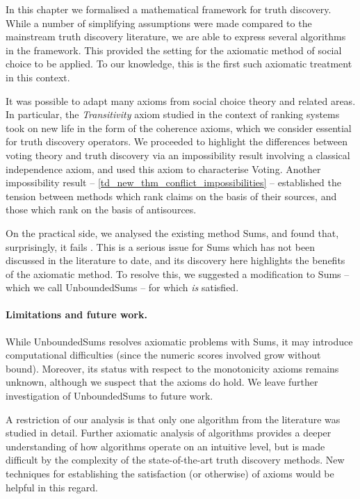 In this chapter we formalised a mathematical framework for truth discovery.
While a number of simplifying assumptions were made compared to the mainstream
truth discovery literature, we are able to express several algorithms in the
framework. This provided the setting for the axiomatic method of social choice
to be applied. To our knowledge, this is the first such axiomatic treatment in
this context.

It was possible to adapt many axioms from social choice theory and related
areas. In particular, the \emph{Transitivity} axiom studied in the context of
ranking systems~\cite{tennenholtz2004,altman2008} took on new life in the form
of the coherence axioms, which we consider essential for truth discovery
operators. We proceeded to highlight the differences between voting theory and
truth discovery via an impossibility result involving a classical independence
axiom, and used this axiom to characterise Voting. Another impossibility result
-- \cref{td_new_thm_conflict_impossibilities} -- established the tension
between methods which rank claims on the basis of their sources, and those
which rank on the basis of antisources.

On the practical side, we analysed the existing method Sums, and found that,
surprisingly, it fails \disjointindependence{}. This is a serious issue for
Sums which has not been discussed in the literature to date, and its discovery
here highlights the benefits of the axiomatic method. To resolve this, we
suggested a modification to Sums -- which we call UnboundedSums -- for which
\disjointindependence{} \emph{is} satisfied.

\paragraph{Limitations and future work.}

While UnboundedSums resolves axiomatic problems with Sums, it may introduce
computational difficulties (since the numeric scores involved grow without
bound). Moreover, its status with respect to the monotonicity axioms remains
unknown, although we suspect that the axioms do hold. We leave further
investigation of UnboundedSums to future work.

A restriction of our analysis is that only one algorithm from the literature
was studied in detail. Further axiomatic analysis of algorithms provides a
deeper understanding of how algorithms operate on an intuitive level, but is
made difficult by the complexity of the state-of-the-art truth discovery
methods. New techniques for establishing the satisfaction (or otherwise) of
axioms would be helpful in this regard.

